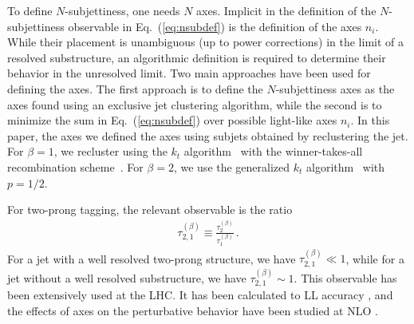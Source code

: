 \documentclass[11pt,letterpaper]{article}
\DeclareRobustCommand{\Eq}[1]{Eq.~(\ref{#1})}
\newcommand{\Nsub}[2]{\tau_{#1}^{(#2)}}
\begin{document}
To define $N$-subjettiness, one needs $N$ axes.
%
Implicit in the definition of the $N$-subjettiness observable in
\Eq{eq:nsubdef} is the definition of the axes $n_i$.
%
While their
placement is unambiguous (up to power corrections) in the limit of a
resolved substructure, an algorithmic definition is required to
determine their behavior in the unresolved limit.
%
Two main approaches
have been used for defining the axes.
%
The first approach is to define
the $N$-subjettiness axes as the axes found using an exclusive jet
clustering algorithm, while the second is to minimize the sum in
\Eq{eq:nsubdef} over possible light-like axes $n_i$.
%
In this paper, the axes we defined the axes using subjets obtained by reclustering the jet.
%
For $\beta = 1$, we recluster using the $k_t$ algorithm~\cite{Catani:1993hr} with the
  winner-takes-all recombination scheme~\cite{Larkoski:2014uqa}.
%
For $\beta = 2$, we use the generalized $k_t$ algorithm~\cite{Cacciari:2011ma} with $p=1/2$.

For two-prong tagging, the relevant observable is the ratio \cite{Thaler:2010tr}
\begin{align}
\Nsub{2,1}{\beta}\equiv \frac{\Nsub{2}{\beta}}{\Nsub{1}{\beta}}\,.
\end{align}
For a jet with a well resolved two-prong structure, we have $\Nsub{2,1}{\beta}\ll 1$, while for a jet without a well resolved substructure, we have $\Nsub{2,1}{\beta}\sim 1$.
%
This observable has been extensively used at the LHC.
%
It has been calculated to LL accuracy \cite{Dasgupta:2015lxh}, and the effects of axes on the perturbative behavior have been studied at NLO \cite{Larkoski:2015uaa}.
\end{document}
